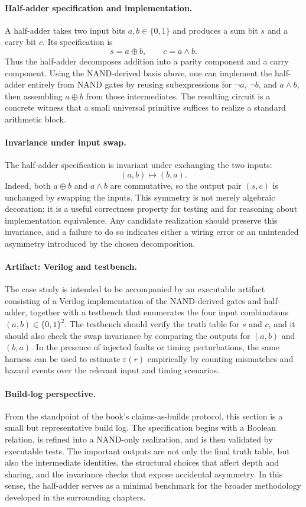 \paragraph{Half-adder specification and implementation.}
A half-adder takes two input bits \(a,b \in \{0,1\}\) and produces a sum bit \(s\) and a carry bit \(c\). Its specification is
\[
 s = a \oplus b, \qquad c = a \wedge b.
\]
Thus the half-adder decomposes addition into a parity component and a carry component. Using the NAND-derived basis above, one can implement the half-adder entirely from NAND gates by reusing subexpressions for \(\neg a\), \(\neg b\), and \(a \wedge b\), then assembling \(a \oplus b\) from those intermediates. The resulting circuit is a concrete witness that a small universal primitive suffices to realize a standard arithmetic block.

\paragraph{Invariance under input swap.}
The half-adder specification is invariant under exchanging the two inputs:
\[
(a,b) \mapsto (b,a).
\]
Indeed, both \(a \oplus b\) and \(a \wedge b\) are commutative, so the output pair \((s,c)\) is unchanged by swapping the inputs. This symmetry is not merely algebraic decoration; it is a useful correctness property for testing and for reasoning about implementation equivalence. Any candidate realization should preserve this invariance, and a failure to do so indicates either a wiring error or an unintended asymmetry introduced by the chosen decomposition.

\paragraph{Artifact: Verilog and testbench.}
The case study is intended to be accompanied by an executable artifact consisting of a Verilog implementation of the NAND-derived gates and half-adder, together with a testbench that enumerates the four input combinations \((a,b) \in \{0,1\}^2\). The testbench should verify the truth table for \(s\) and \(c\), and it should also check the swap invariance by comparing the outputs for \((a,b)\) and \((b,a)\). In the presence of injected faults or timing perturbations, the same harness can be used to estimate \(\varepsilon(r)\) empirically by counting mismatches and hazard events over the relevant input and timing scenarios.

\paragraph{Build-log perspective.}
From the standpoint of the book's claims-as-builds protocol, this section is a small but representative build log. The specification begins with a Boolean relation, is refined into a NAND-only realization, and is then validated by executable tests. The important outputs are not only the final truth table, but also the intermediate identities, the structural choices that affect depth and sharing, and the invariance checks that expose accidental asymmetry. In this sense, the half-adder serves as a minimal benchmark for the broader methodology developed in the surrounding chapters.


